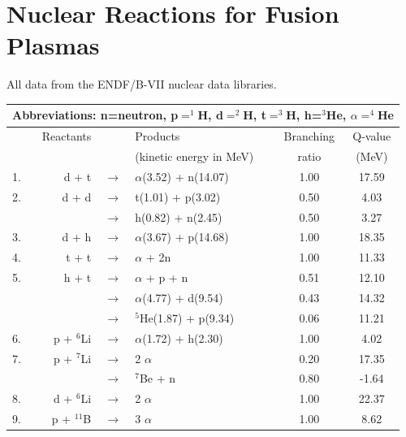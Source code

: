 \section{Nuclear Reactions for Fusion Plasmas}
\noindent
All data from the ENDF/B-VII nuclear data libraries.\cite{chadwick}
\begin{table}[h!]\small
  \centering
  \begin{tabular}{l r c l c c}
    \multicolumn{6}{c}{Abbreviations: n=neutron, p$=^1$H, d$=^2$H, t$=^3$H, h=$^3$He, $\alpha=^4$He}\\
    \hline
    & Reactants \T & & Products & Branching & Q-value \\[5pt]
    &           \B & & (kinetic energy in MeV) & ratio & (MeV) \\[5pt]
    \hline\hline
    1.\T & d + t        & $\longrightarrow$ & $\alpha$(3.52) + n(14.07) & 1.00  & 17.59 \\[5pt]
    2.   & d + d        & $\longrightarrow$ & t(1.01) + p(3.02)         & 0.50  &  4.03 \\[5pt]
         &              & $\longrightarrow$ & h(0.82) + n(2.45)         & 0.50  &  3.27 \\[5pt]
    3.   & d + h        & $\longrightarrow$ & $\alpha$(3.67) + p(14.68) & 1.00  & 18.35 \\[5pt]
    4.   & t + t        & $\longrightarrow$ & $\alpha$ + 2n             & 1.00  & 11.33 \\[5pt]
    5.   & h + t        & $\longrightarrow$ & $\alpha$ + p + n          & 0.51  & 12.10 \\[5pt]
         &              & $\longrightarrow$ & $\alpha$(4.77) + d(9.54)  & 0.43  & 14.32 \\[5pt]
         &              & $\longrightarrow$ & $^5$He(1.87) + p(9.34)    & 0.06  & 11.21 \\[5pt]
    6.   & p + $^6$Li   & $\longrightarrow$ & $\alpha$(1.72) + h(2.30)  & 1.00  &  4.02 \\[5pt]
    7.   & p + $^7$Li   & $\longrightarrow$ & 2 $\alpha$                & 0.20  & 17.35 \\[5pt]
         &              & $\longrightarrow$ & $^7$Be + n                & 0.80  & -1.64 \\[5pt]
    8.   & d + $^6$Li   & $\longrightarrow$ & 2 $\alpha$                & 1.00  & 22.37 \\[5pt]
    9.\B & p + $^{11}$B & $\longrightarrow$ & 3 $\alpha$                & 1.00  &  8.62 \\[5pt]
    \hline
  \end{tabular}
  \label{plasmaReactions}
\end{table}

